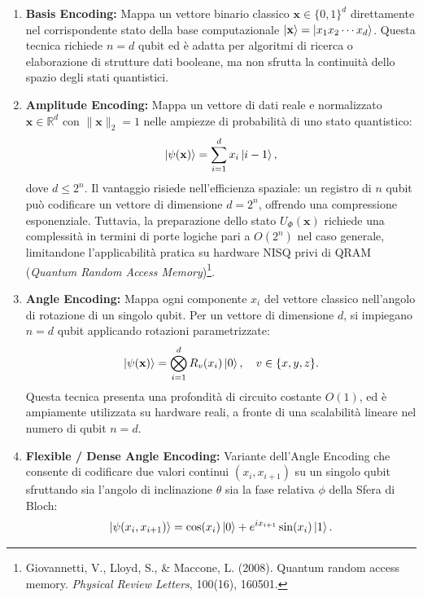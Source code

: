 \begin{enumerate}
    \item \textbf{Basis Encoding:} Mappa un vettore binario classico $\mathbf{x} \in \{0, 1\}^d$ direttamente nel corrispondente stato della base computazionale $\ket{\mathbf{x}} = \ket{x_1 x_2 \cdots x_d}$. Questa tecnica richiede $n = d$ qubit ed è adatta per algoritmi di ricerca o elaborazione di strutture dati booleane, ma non sfrutta la continuità dello spazio degli stati quantistici.
    \item \textbf{Amplitude Encoding:} Mappa un vettore di dati reale e normalizzato $\mathbf{x} \in \mathbb{R}^d$ con $\|\mathbf{x}\|_2 = 1$ nelle ampiezze di probabilità di uno stato quantistico:
    \begin{equation}
    \ket{\psi(\mathbf{x})} = \sum_{i=1}^{d} x_i \ket{i-1},
    \end{equation}
    dove $d \le 2^n$. Il vantaggio risiede nell'efficienza spaziale: un registro di $n$ qubit può codificare un vettore di dimensione $d = 2^n$, offrendo una compressione esponenziale. Tuttavia, la preparazione dello stato $U_\Phi(\mathbf{x})$ richiede una complessità in termini di porte logiche pari a $O(2^n)$ nel caso generale, limitandone l'applicabilità pratica su hardware NISQ privi di QRAM (\textit{Quantum Random Access Memory})\footnote{Giovannetti, V., Lloyd, S., \& Maccone, L. (2008). Quantum random access memory. \textit{Physical Review Letters}, 100(16), 160501.}.
    \item \textbf{Angle Encoding:} Mappa ogni componente $x_i$ del vettore classico nell'angolo di rotazione di un singolo qubit. Per un vettore di dimensione $d$, si impiegano $n = d$ qubit applicando rotazioni parametrizzate:
    \begin{equation}
    \ket{\psi(\mathbf{x})} = \bigotimes_{i=1}^{d} R_v(x_i) \ket{0}, \quad v \in \{x, y, z\}.
    \end{equation}
    Questa tecnica presenta una profondità di circuito costante $O(1)$, ed è ampiamente utilizzata su hardware reali, a fronte di una scalabilità lineare nel numero di qubit $n = d$.
    \item \textbf{Flexible / Dense Angle Encoding:} Variante dell'Angle Encoding che consente di codificare due valori continui $(x_i, x_{i+1})$ su un singolo qubit sfruttando sia l'angolo di inclinazione $\theta$ sia la fase relativa $\phi$ della Sfera di Bloch:
    \begin{equation}
    \ket{\psi(x_i, x_{i+1})} = \cos(x_i)\ket{0} + e^{i x_{i+1}}\sin(x_i)\ket{1}.
    \end{equation}
\end{enumerate}

